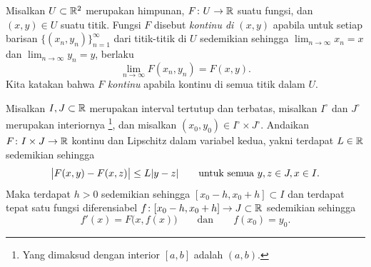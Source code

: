 \begin{defn}
Misalkan $U \subset {\mathbb{R}}^2$ merupakan himpunan, $F \colon U \to {\mathbb{R}}$ suatu fungsi,
dan $(x,y) \in U$ suatu titik.  Fungsi $F$ disebut
\emph{kontinu di $(x,y)$}
apabila untuk setiap barisan
$\bigl\{ (x_n,y_n) \bigr\}_{n=1}^\infty$ dari titik-titik di $U$ sedemikian sehingga
$\lim_{n\to\infty} x_n = x$ dan
$\lim_{n\to\infty} y_n = y$, berlaku
\begin{equation*}
\lim_{n \to \infty} F(x_n,y_n) = 
F(x,y) .
\end{equation*}
Kita katakan bahwa $F$ \emph{kontinu} apabila kontinu di semua titik dalam $U$.
\end{defn}

\begin{thm}%
%
\label{thm:fs:picard}
Misalkan $I, J \subset {\mathbb{R}}$ merupakan interval tertutup dan terbatas,
misalkan $I^\circ$ dan $J^\circ$ merupakan interiornya%
\footnote{Yang dimaksud dengan interior $[a,b]$ adalah $(a,b)$.},
dan
misalkan $(x_0,y_0) \in I^\circ \times J^\circ$.
Andaikan $F \colon I \times J \to {\mathbb{R}}$ kontinu
dan Lipschitz dalam variabel kedua, yakni terdapat
$L \in {\mathbb{R}}$ sedemikian sehingga
\begin{equation*}
\bigl\lvert {F(x,y) - F(x,z)} \bigr\rvert \leq L \lvert {y-z} \rvert
\qquad \text{untuk semua } y,z \in J, x \in I .
\end{equation*}
Maka terdapat $h > 0$ sedemikian sehingga $[x_0-h,x_0+h] \subset I$ dan terdapat tepat satu fungsi
diferensiabel $f \colon [x_0 - h, x_0 + h] \to J \subset {\mathbb{R}}$ sedemikian sehingga
\begin{equation} \label{picard:diffeq}
f'(x) = F\bigl(x,f(x)\bigr) \qquad \text{dan} \qquad f(x_0) = y_0.
\end{equation}
\end{thm}

